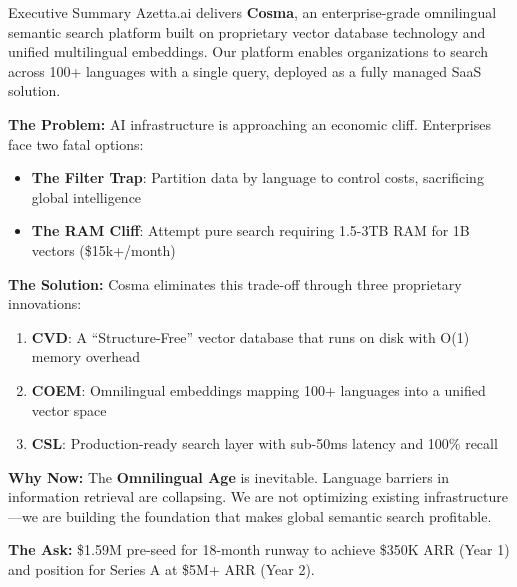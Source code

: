 \begin{center}
\vspace{1cm}
\begin{minipage}{0.9\textwidth}

\begin{cosmabox}[cosmaBlue]{Executive Summary}
Azetta.ai delivers \textbf{Cosma}, an enterprise-grade omnilingual semantic search platform built on proprietary vector database technology and unified multilingual embeddings. Our platform enables organizations to search across 100+ languages with a single query, deployed as a fully managed SaaS solution.

\vspace{0.3cm}
\textbf{The Problem:} AI infrastructure is approaching an economic cliff. Enterprises face two fatal options:
\begin{itemize}[noitemsep]
    \item \textbf{The Filter Trap}: Partition data by language to control costs, sacrificing global intelligence
    \item \textbf{The RAM Cliff}: Attempt pure search requiring 1.5-3TB RAM for 1B vectors (\$15k+/month)
\end{itemize}

\vspace{0.3cm}
\textbf{The Solution:} Cosma eliminates this trade-off through three proprietary innovations:
\begin{enumerate}[noitemsep]
    \item \textbf{CVD}: A ``Structure-Free'' vector database that runs on disk with O(1) memory overhead
    \item \textbf{COEM}: Omnilingual embeddings mapping 100+ languages into a unified vector space
    \item \textbf{CSL}: Production-ready search layer with sub-50ms latency and 100\% recall
\end{enumerate}

\vspace{0.3cm}
\textbf{Why Now:} The \textbf{Omnilingual Age} is inevitable. Language barriers in information retrieval are collapsing. We are not optimizing existing infrastructure—we are building the foundation that makes global semantic search profitable.

\vspace{0.3cm}
\textbf{The Ask:} \$1.59M pre-seed for 18-month runway to achieve \$350K ARR (Year 1) and position for Series A at \$5M+ ARR (Year 2).
\end{cosmabox}

\end{minipage}
\end{center}
